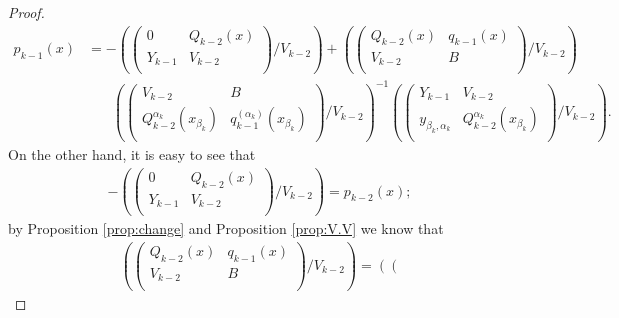 \documentclass[preprint,12pt]{elsarticle}
\begin{document}
\begin{proof}
\begin{align*}
p_{k-1}(x)&=-\left(\left(
                       \begin{array}{cc}
                         0 & Q_{k-2}(x) \\
                         Y_{k-1} & V_{k-2} \\
                       \end{array}
                     \right)
/V_{k-2}\right)+\left(\left(
       \begin{array}{cc}
         Q_{k-2}(x) & q_{k-1}(x) \\
         V_{k-2} & B \\
       \end{array}
     \right)
/V_{k-2}\right)\\
&~~~~~~~~\left(\left(
            \begin{array}{cc}
              V_{k-2} & B \\
              Q_{k-2}^{\alpha_{k}}(x_{\beta_{k}}) &  q_{k-1}^{(\alpha_k)}(x_{\beta_k})\\
            \end{array}
          \right)
/V_{k-2}\right)^{-1}
\left(\left(
                \begin{array}{cc}
                  Y_{k-1} & V_{k-2} \\
                  y_{\beta_{k},\alpha_{k}} & Q_{k-2}^{\alpha_{k}}(x_{\beta_{k}})  \\
                \end{array}
              \right)
/V_{k-2}\right).
\end{align*}
On the other hand, it is easy to see that
\begin{align*}
-\left(\left(
                       \begin{array}{cc}
                         0 & Q_{k-2}(x) \\
                         Y_{k-1} & V_{k-2} \\
                       \end{array}
                     \right)
/V_{k-2}\right)= p_{k-2}(x);
\end{align*}
by Proposition \ref{prop:change} and Proposition \ref{prop:V.V} we know that 
\begin{align*}
&\left(\left(
       \begin{array}{cc}
         Q_{k-2}(x) & q_{k-1}(x) \\
         V_{k-2} & B \\
       \end{array}
     \right)
/V_{k-2}\right)
=\left(\left(
       \begin{array}{cc}

\end{array}
\end{align*}
\end{proof}
\end{document}
